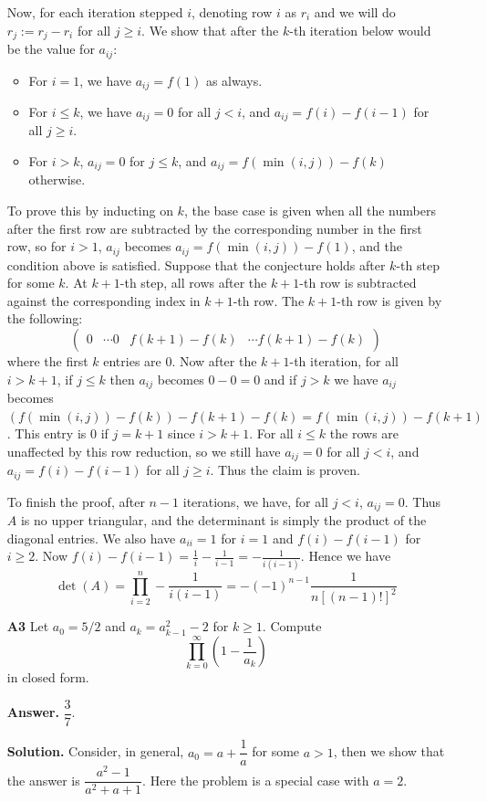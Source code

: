 \documentclass[11pt,a4paper]{article}
\newcommand{\<}{\langle}
\renewcommand{\>}{\rangle}
\begin{document}
\begin{enumerate}
	Now, for each iteration stepped $i$, denoting row $i$ as $r_i$ and we will do $r_{j}:=r_{j}-r_i$ for all $j\ge i$. We show that after the $k$-th iteration below would be the value for $a_{ij}$: 
	\begin{itemize}
		\item For $i=1$, we have $a_{ij}=f(1)$ as always. 
		\item For $i\le k$, we have $a_{ij}=0$ for all $j<i$, and $a_{ij}=f(i)-f(i-1)$ for all $j\ge i$. 
		\item For $i>k$, $a_{ij}=0$ for $j\le k$, and $a_{ij}=f(\min(i, j))-f(k)$ otherwise. 
	\end{itemize}
	To prove this by inducting on $k$, the base case is given when all the numbers after the first row are subtracted by the corresponding number in the first row, so for $i>1$, $a_{ij}$ becomes $a_{ij}=f(\min(i, j))-f(1)$, and the condition above is satisfied. Suppose that the conjecture holds after $k$-th step for some $k$. At $k+1$-th step, all rows after the $k+1$-th row is subtracted against the corresponding index in $k+1$-th row. The $k+1$-th row is given by the following: 
	\[\begin{pmatrix}0 & \cdots 0 & f(k+1)-f(k) & \cdots f(k+1)-f(k)\end{pmatrix}\]
	where the first $k$ entries are 0. Now after the $k+1$-th iteration, for all $i>k+1$, if $j\le k$ then $a_{ij}$ becomes $0-0=0$ and if $j>k$ we have $a_{ij}$ becomes $(f(\min(i, j))-f(k))-f(k+1)-f(k)=f(\min(i, j))-f(k+1)$. This entry is 0 if $j=k+1$ since $i>k+1$. For all $i\le k$ the rows are unaffected by this row reduction, so we still have $a_{ij}=0$ for all $j<i$, and $a_{ij}=f(i)-f(i-1)$ for all $j\ge i$. Thus the claim is proven. 
	
	To finish the proof, after $n-1$ iterations, we have, for all $j<i$, $a_{ij}=0$. Thus $A$ is no upper triangular, and the determinant is simply the product of the diagonal entries. We also have $a_{ii}=1$ for $i=1$ and $f(i)-f(i-1)$ for $i\ge 2$. Now $f(i)-f(i-1)=\frac{1}{i}-\frac{1}{i-1}=-\frac{1}{i(i-1)}$. Hence we have 
	\[\det(A)=\prod_{i=2}^n -\frac{1}{i(i-1)}= - (-1)^{n-1}\frac{1}{n[(n-1)!]^2}\]
	
	\item[\textbf{A3}] 
	Let $a_0=5/2$ and $a_k=a_{k-1}^2-2$ for $k\ge 1.$ Compute\[\prod_{k=0}^{\infty}\left(1-\frac1{a_k}\right)\]in closed form.
	
	\textbf{Answer.} $\dfrac 37$. 
	
	\textbf{Solution.} Consider, in general, $a_0=a+\dfrac 1a$ for some $a>1$, 
	then we show that the answer is $\dfrac{a^2-1}{a^2+a+1}$. 
	Here the problem is a special case with $a=2$. 
	

\end{enumerate}
\end{document}

